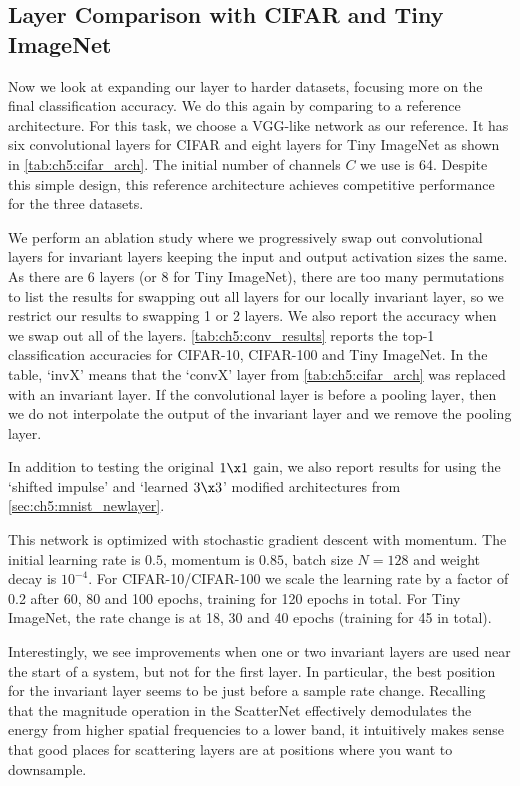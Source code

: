 

\subsection{Layer Comparison with CIFAR and Tiny ImageNet}\label{sec:ch5:conv_exp}
Now we look at expanding our layer to harder datasets, focusing more on the
final classification accuracy. We do this again by comparing to a reference
architecture. For this task, we choose a VGG-like network as our reference.
It has six convolutional layers for CIFAR and eight layers for Tiny ImageNet as shown in
\autoref{tab:ch5:cifar_arch}. The initial number of channels $C$ we use is 64. Despite
this simple design, this reference architecture achieves competitive performance
for the three datasets.

We perform an ablation study where we progressively swap out convolutional
layers for invariant layers keeping the input and output activation sizes the
same. As there are 6 layers (or 8 for Tiny ImageNet), there are too many
permutations to list the results for swapping out all layers for our locally
invariant layer, so we restrict our results to swapping 1 or 2 layers. We also
report the accuracy when we swap out all of the layers.
\autoref{tab:ch5:conv_results} reports the top-1 classification accuracies for
CIFAR-10, CIFAR-100 and Tiny ImageNet. In the table, `invX'
means that the `convX' layer from \autoref{tab:ch5:cifar_arch} was replaced with an 
invariant layer. If the convolutional layer is before a pooling layer, then we
do not interpolate the output of the invariant layer and we remove the pooling
layer. 

In addition to testing the original $1\x 1$ gain, we also report results for using 
the `shifted impulse' and `learned $3\x 3$' modified architectures from 
\autoref{sec:ch5:mnist_newlayer}. 

This network is optimized with stochastic gradient descent with momentum. The
initial learning rate is $0.5$, momentum is $0.85$, batch size $N=128$ and
weight decay is $10^{-4}$. For CIFAR-10/CIFAR-100 we scale the learning rate by
a factor of 0.2 after 60, 80 and 100 epochs, training for 120 epochs in total.
For Tiny ImageNet, the rate change is at 18, 30 and 40 epochs (training for 45 in total).



Interestingly, we see improvements when one or two invariant layers are used
near the start of a system, but not for the first layer. In particular, the best
position for the invariant layer seems to be just before a sample rate change.
Recalling that the magnitude operation in the ScatterNet effectively
demodulates the energy from higher spatial frequencies to a lower band, it
intuitively makes sense that good places for scattering layers are at
positions where you want to downsample. 

